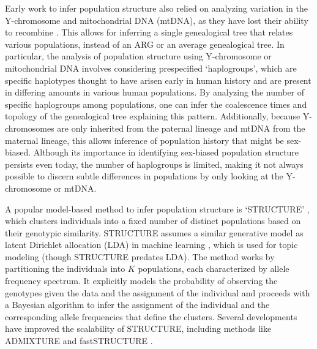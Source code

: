 Early work to infer population structure also relied on analyzing variation in the Y-chromosome and mitochondrial DNA (mtDNA), as they have lost their ability to recombine \cite{Cann1987, tilford2001physical}. This allows for inferring a single genealogical tree that relates various populations, instead of an ARG or an average genealogical tree. In particular, the analysis of population structure using Y-chromosome or mitochondrial DNA involves considering prespecified `haplogroups', which are specific haplotypes thought to have arisen early in human history and are present in differing amounts in various human populations. By analyzing the number of specific haplogroups among populations, one can infer the coalescence times and topology of the genealogical tree explaining this pattern. Additionally, because Y-chromosomes are only inherited from the paternal lineage and mtDNA from the maternal lineage, this allows inference of population history that might be sex-biased. Although its importance in identifying sex-biased population structure persists even today, the number of haplogroups is limited, making it not always possible to discern subtle differences in populations by only looking at the Y-chromosome or mtDNA.

A popular model-based method to infer population structure is `STRUCTURE' \cite{Pritchard2000}, which clusters individuals into a fixed number of distinct populations based on their genotypic similarity. STRUCTURE assumes a similar generative model as latent Dirichlet allocation (LDA) in machine learning \cite{Blei2003}, which is used for topic modeling (though STRUCTURE predates LDA). The method works by partitioning the individuals into \(K\) populations, each characterized by allele frequency spectrum. It explicitly models the probability of observing the genotypes given the data and the assignment of the individual and proceeds with a Bayesian algorithm to infer the assignment of the individual and the corresponding allele frequencies that define the clusters. Several developments have improved the scalability of STRUCTURE, including methods like ADMIXTURE \cite{Alexander2009} and fastSTRUCTURE \cite{Raj2014}.

